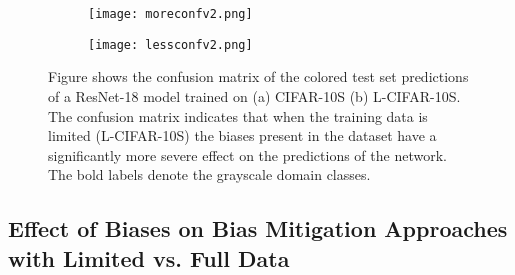 \documentclass[10pt,twocolumn,letterpaper]{article}
\begin{document}
\begin{figure}
     \centering
     \begin{subfigure}[b]{0.23\textwidth}
         \centering
         \texttt{[image: moreconfv2.png]}
         \caption{}
     \end{subfigure}
     \begin{subfigure}[b]{0.23\textwidth}
         \centering
         \texttt{[image: lessconfv2.png]}
         \caption{}
     \end{subfigure}
     
        \caption{Figure shows the confusion matrix of the colored test set predictions of a ResNet-18 model trained on (a) CIFAR-10S (b) L-CIFAR-10S. The confusion matrix indicates that when the training data is limited (L-CIFAR-10S) the biases present in the dataset have a significantly more severe effect on the predictions of the network. The bold labels denote the grayscale domain classes.}
        \label{fig:confusion}
        \vspace{-16pt}
\end{figure}



\subsection{Effect of Biases on Bias Mitigation Approaches with Limited vs. Full Data }
\end{document}
